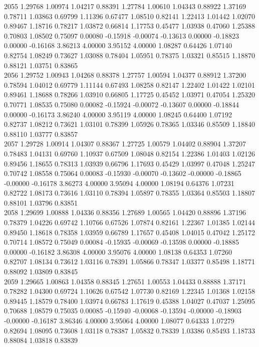 {2055 1.29768 1.00974 1.04217 0.88391 1.27784 1.00610 1.04343 0.88922 1.37169 0.78711 1.03863 0.69799 1.11396 0.67477 1.08510 0.82141 1.22413 1.01442 1.02070 0.89467 1.18716 0.78217 1.03872 0.66814 1.17753 0.45477 1.03938 0.47060 1.25388 0.70803 1.08502 0.75097 0.00080 -0.15918 -0.00074 -0.13613 0.00000 -0.18823 0.00000 -0.16168 3.86213 4.00000 3.95152 4.00000 1.08287 0.64426 1.07140 0.82754 1.08249 0.73627 1.03088 0.78404 1.05951 0.78375 1.03321 0.85515 1.18870 0.88121 1.03751 0.83865 \\
2056 1.29752 1.00943 1.04268 0.88378 1.27757 1.00594 1.04377 0.88912 1.37200 0.78594 1.04012 0.69779 1.11144 0.67493 1.08258 0.82147 1.22402 1.01422 1.02101 0.89461 1.18688 0.78266 1.03910 0.66805 1.17725 0.45452 1.03971 0.47054 1.25320 0.70771 1.08535 0.75080 0.00082 -0.15924 -0.00072 -0.13607 0.00000 -0.18844 0.00000 -0.16173 3.86240 4.00000 3.95119 4.00000 1.08245 0.64400 1.07192 0.82737 1.08212 0.73621 1.03101 0.78399 1.05926 0.78365 1.03346 0.85509 1.18840 0.88110 1.03777 0.83857 \\
2057 1.29728 1.00914 1.04307 0.88367 1.27725 1.00579 1.04402 0.88904 1.37207 0.78483 1.04131 0.69760 1.10937 0.67509 1.08048 0.82154 1.22386 1.01403 1.02126 0.89456 1.18655 0.78313 1.03939 0.66796 1.17693 0.45429 1.03997 0.47048 1.25247 0.70742 1.08558 0.75064 0.00083 -0.15930 -0.00070 -0.13602 -0.00000 -0.18865 -0.00000 -0.16178 3.86273 4.00000 3.95094 4.00000 1.08194 0.64376 1.07231 0.82722 1.08173 0.73616 1.03110 0.78394 1.05897 0.78355 1.03364 0.85503 1.18807 0.88101 1.03796 0.83851 \\
2058 1.29699 1.00888 1.04336 0.88356 1.27689 1.00565 1.04420 0.88896 1.37196 0.78379 1.04226 0.69742 1.10766 0.67526 1.07874 0.82161 1.22367 1.01385 1.02144 0.89450 1.18618 0.78358 1.03959 0.66789 1.17657 0.45408 1.04015 0.47042 1.25172 0.70714 1.08572 0.75049 0.00084 -0.15935 -0.00069 -0.13598 0.00000 -0.18885 0.00000 -0.16182 3.86308 4.00000 3.95076 4.00000 1.08138 0.64353 1.07260 0.82707 1.08134 0.73612 1.03116 0.78391 1.05866 0.78347 1.03377 0.85498 1.18771 0.88092 1.03809 0.83845 \\
2059 1.29665 1.00863 1.04358 0.88345 1.27651 1.00553 1.04433 0.88888 1.37171 0.78282 1.04300 0.69724 1.10626 0.67542 1.07730 0.82169 1.22345 1.01368 1.02158 0.89445 1.18579 0.78400 1.03974 0.66783 1.17619 0.45388 1.04027 0.47037 1.25095 0.70688 1.08579 0.75035 0.00085 -0.15940 -0.00068 -0.13594 -0.00000 -0.18903 -0.00000 -0.16187 3.86346 4.00000 3.95064 4.00000 1.08077 0.64333 1.07279 0.82694 1.08095 0.73608 1.03118 0.78387 1.05832 0.78339 1.03386 0.85493 1.18733 0.88084 1.03818 0.83839 \\
}
